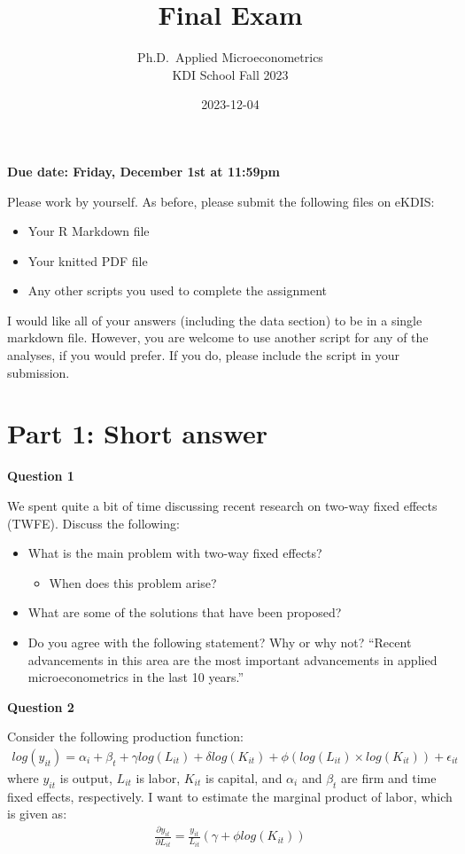 \documentclass[
]{article}
\title{Final Exam}
\subtitle{Ph.D.~Applied Microeconometrics\\
KDI School Fall 2023}
\author{}
\date{\vspace{-2.5em}2023-12-04}
\providecommand{\tightlist}{%
  \setlength{\itemsep}{0pt}\setlength{\parskip}{0pt}}
\begin{document}
\maketitle

\textbf{Due date: Friday, December 1st at 11:59pm}

Please work by yourself. As before, please submit the following files on eKDIS:

\begin{itemize}
\tightlist
\item
  Your R Markdown file
\item
  Your knitted PDF file
\item
  Any other scripts you used to complete the assignment
\end{itemize}

I would like all of your answers (including the data section) to be in a single markdown file. However, you are welcome to use another script for any of the analyses, if you would prefer. If you do, please include the script in your submission.

\hypertarget{part-1-short-answer}{%
\section{Part 1: Short answer}\label{part-1-short-answer}}

\textbf{Question 1}

We spent quite a bit of time discussing recent research on two-way fixed effects (TWFE). Discuss the following:

\begin{itemize}
\tightlist
\item
  What is the main problem with two-way fixed effects?

  \begin{itemize}
  \tightlist
  \item
    When does this problem arise?
  \end{itemize}
\item
  What are some of the solutions that have been proposed?
\item
  Do you agree with the following statement? Why or why not? ``Recent advancements in this area are the most important advancements in applied microeconometrics in the last 10 years.''
\end{itemize}

\textbf{Question 2}

Consider the following production function:
\begin{gather} \label{eq:prod} log(y_{it}) = \alpha_i + \beta_t + \gamma log(L_{it}) + \delta log(K_{it}) + \phi\left(log(L_{it})\times log(K_{it})\right) + \epsilon_{it} \end{gather}
where \(y_{it}\) is output, \(L_{it}\) is labor, \(K_{it}\) is capital, and \(\alpha_i\) and \(\beta_t\) are firm and time fixed effects, respectively. I want to estimate the marginal product of labor, which is given as:
\begin{gather} \label{eq:mp} \frac{\partial y_{it}}{\partial L_{it}} = \frac{y_{it}}{L_{it}}\left(\gamma + \phi log(K_{it})\right) \end{gather}
\end{document}
